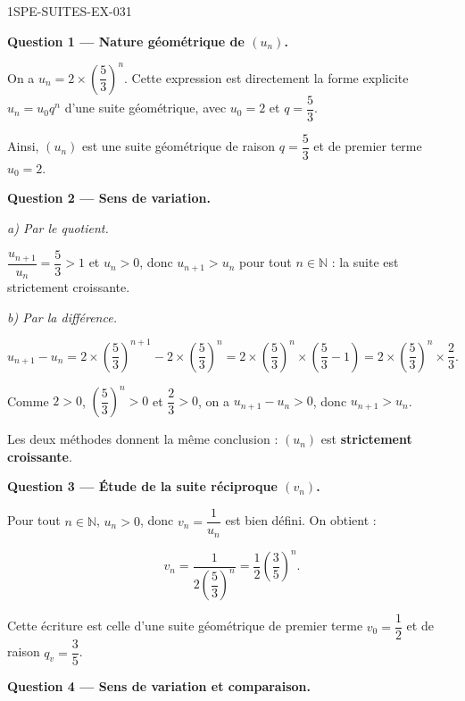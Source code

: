 \begin{corrige}{1SPE-SUITES-EX-031}

\textbf{Question 1 — Nature géométrique de $(u_n)$.}

On a $u_n = 2 \times \left(\dfrac{5}{3}\right)^n$. Cette expression est directement la forme explicite $u_n=u_0q^n$ d'une suite géométrique, avec $u_0=2$ et $q=\dfrac53$.

Ainsi, $(u_n)$ est une suite géométrique de raison $q = \dfrac{5}{3}$ et de premier terme $u_0 = 2$.


\medskip
\textbf{Question 2 — Sens de variation.}

\textit{a) Par le quotient.}

$\dfrac{u_{n+1}}{u_n} = \dfrac{5}{3} > 1$ et $u_n > 0$, donc $u_{n+1} > u_n$ pour tout $n \in \mathbb{N}$ : la suite est strictement croissante.

\textit{b) Par la différence.}

\[
  u_{n+1} - u_n = 2 \times \left(\frac{5}{3}\right)^{n+1} - 2 \times \left(\frac{5}{3}\right)^n = 2 \times \left(\frac{5}{3}\right)^n \times \left(\frac{5}{3} - 1\right) = 2 \times \left(\frac{5}{3}\right)^n \times \frac{2}{3}.
\]


Comme $2 > 0$, $\left(\dfrac{5}{3}\right)^n > 0$ et $\dfrac{2}{3} > 0$, on a $u_{n+1} - u_n > 0$, donc $u_{n+1} > u_n$.

Les deux méthodes donnent la même conclusion : $(u_n)$ est \textbf{strictement croissante}.

\medskip
\textbf{Question 3 — Étude de la suite réciproque $(v_n)$.}

Pour tout $n \in \mathbb{N}$, $u_n>0$, donc $v_n=\dfrac{1}{u_n}$ est bien défini. On obtient :

\[
  v_n = \frac{1}{2\left(\dfrac{5}{3}\right)^n} = \frac{1}{2}\left(\frac{3}{5}\right)^n.
\]

Cette écriture est celle d'une suite géométrique de premier terme $v_0=\dfrac{1}{2}$ et de raison $q_v = \dfrac{3}{5}$.


\medskip
\textbf{Question 4 — Sens de variation et comparaison.}


\end{corrige}

